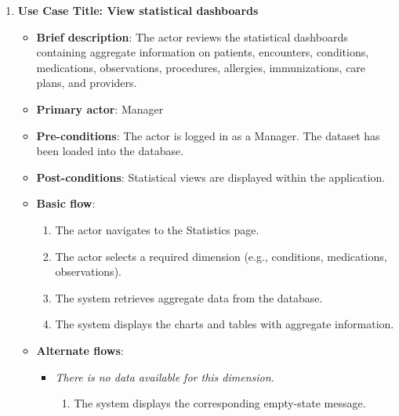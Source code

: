 \begin{enumerate}
\item \textbf{Use Case Title: View statistical dashboards}
\begin{itemize}
    \item \textbf{Brief description}: The actor reviews the statistical dashboards containing aggregate information on patients, encounters, conditions, medications, observations, procedures, allergies, immunizations, care plans, and providers.
    \item \textbf{Primary actor}: Manager
    \item \textbf{Pre-conditions}: The actor is logged in as a Manager. The dataset has been loaded into the database.
    \item \textbf{Post-conditions}: Statistical views are displayed within the application.
    \item \textbf{Basic flow}:
    \begin{enumerate}
        \item The actor navigates to the Statistics page.
        \item The actor selects a required dimension (e.g., conditions, medications, observations).
        \item The system retrieves aggregate data from the database.
        \item The system displays the charts and tables with aggregate information.
    \end{enumerate}
    \item \textbf{Alternate flows}:
    \begin{itemize}
        \item[3a.] \textit{There is no data available for this dimension.}
        \begin{enumerate}
            \item The system displays the corresponding empty-state message.
        \end{enumerate}
    \end{itemize}
\end{itemize}

\vspace{0.5em}


\end{enumerate}
